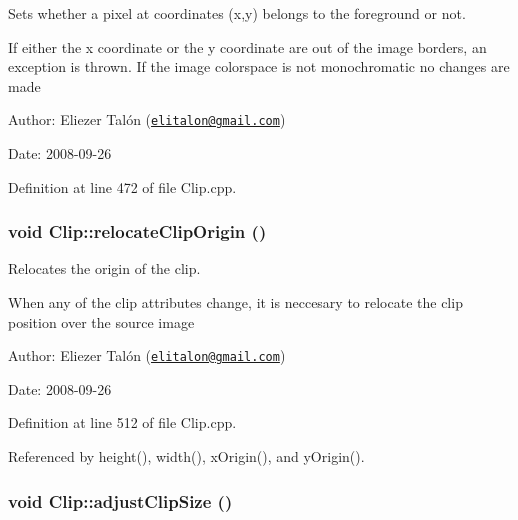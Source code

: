 Sets whether a pixel at coordinates (x,y) belongs to the foreground or not. 

If either the x coordinate or the y coordinate are out of the image borders, an exception is thrown. If the image colorspace is not monochromatic no changes are made

\begin{Desc}
\item[Author:]Eliezer Talón (\href{mailto:elitalon@gmail.com}{\tt elitalon@gmail.com}) \end{Desc}
\begin{Desc}
\item[Date:]2008-09-26 \end{Desc}


Definition at line 472 of file Clip.cpp.\hypertarget{class_clip_66fc93c15de96d077d2242a53576528e}{
\subsubsection[relocateClipOrigin]{\setlength{\rightskip}{0pt plus 5cm}void Clip::relocateClipOrigin ()}}
\label{class_clip_66fc93c15de96d077d2242a53576528e}


Relocates the origin of the clip. 

When any of the clip attributes change, it is neccesary to relocate the clip position over the source image

\begin{Desc}
\item[Author:]Eliezer Talón (\href{mailto:elitalon@gmail.com}{\tt elitalon@gmail.com}) \end{Desc}
\begin{Desc}
\item[Date:]2008-09-26 \end{Desc}


Definition at line 512 of file Clip.cpp.

Referenced by height(), width(), xOrigin(), and yOrigin().\hypertarget{class_clip_e050cf90340e9160f79688627d69a00b}{
\subsubsection[adjustClipSize]{\setlength{\rightskip}{0pt plus 5cm}void Clip::adjustClipSize ()}}
\label{class_clip_e050cf90340e9160f79688627d69a00b}



